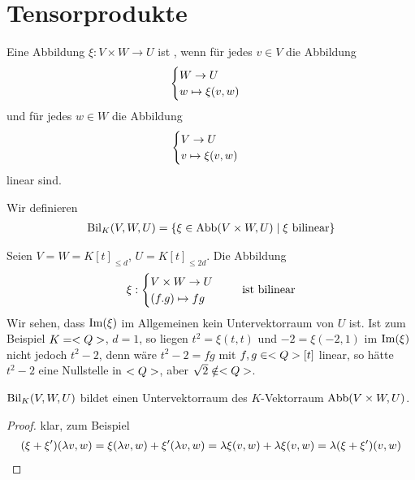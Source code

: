\section{Tensorprodukte}

\begin{definition}
	Eine Abbildung $\xi:V\times W\to U$ ist , wenn für jedes $v\in V$ die Abbildung 
	\begin{align}
		\begin{cases}
		W\to U \\ w\mapsto \xi(v,w)
		\end{cases}\notag
	\end{align}
	und für jedes $w\in W$ die Abbildung
	\begin{align}
	\begin{cases}
	V\to U \\ v\mapsto \xi(v,w)
	\end{cases}\notag
	\end{align}
	linear sind.
	
	Wir definieren
	\begin{align}
		\operatorname{Bil}_K(V,W,U)=\{\xi\in\operatorname{Abb}(V\times W,U)\mid \xi\text{ bilinear}\}\notag
	\end{align}
\end{definition}

\begin{example}
	Seien $V=W=K[t]_{\le d}$, $U=K[t]_{\le 2d}$. Die Abbildung
	\begin{align}
	\xi:\begin{cases}
	V\times W\to U \\ (f.g)\mapsto fg
	\end{cases}\quad\text{ ist bilinear}\notag
	\end{align}
	Wir sehen, dass $\operatorname{Im}(\xi)$ im Allgemeinen kein Untervektorraum von $U$ ist. Ist zum Beispiel $K=<Q>$, $d=1$, so liegen $t^2=\xi(t,t)$ und $-2=\xi(-2,1)$ im $\operatorname{Im}(\xi)$ nicht jedoch $t^2-2$, denn wäre $t^2-2=fg$ mit $f,g\in<Q>[t]$ linear, so hätte $t^2-2$ eine Nullstelle in $<Q>$, aber $\sqrt{2}\notin<Q>$.
\end{example}

\begin{lemma}
	$\operatorname{Bil}_K(V,W,U)$ bildet einen Untervektorraum des $K$-Vektorraum $\operatorname{Abb}(V\times W,U)$.
\end{lemma}
\begin{proof}
	klar, zum Beispiel
	\begin{align}
		(\xi+\xi')(\lambda v,w)=\xi(\lambda v,w)+\xi'(\lambda v,w)=\lambda\xi(v,w)+\lambda\xi(v,w)= \lambda(\xi+\xi')(v,w)\notag
	\end{align}
\end{proof}

